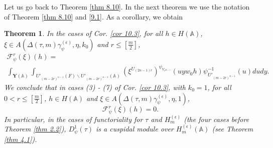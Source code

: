 \documentclass[12pts]{amsart}
\newcommand{\BA}{{\mathbb {A}}}
\newtheorem{thm}{Theorem}[section]
\begin{document}
Let us go back to Theorem \ref{thm 8.10}. In the next theorem we use the notation of Theorem \ref{thm 8.10} and \eqref{9.1}. As a corollary, we obtain

\begin{thm}\label{thm 11.2}
In the cases of Cor. \ref{cor 10.3}, for all $h\in H(\BA)$, $\xi\in A(\Delta(\tau,m)\gamma_\psi^{(\epsilon)},\eta,k_0)$ and 
$r\leq [\frac{m}{2}]$,
\begin{multline}\label{11.50}
\mathcal{F}^r_\psi(\xi)(h)=\\
\int_{\mathbf{Y}(\BA)} \int_{U'_{{(m-2r)}^{n-1}}(F)\backslash
	U'_{{(m-2r)}^{n-1}}(\BA)}(\xi^{U_{(2n-1)r}})^{\psi_{V_{r^{2n-1}}}}(uyw_0h)\psi^{-1}_{U'_{{(m-2r)}^{n-1}}}(u)dudy.
\end{multline}
We conclude that in cases (3) - (7) of Cor. \ref{cor 10.3}, with $k_0=1$, for all $0<r\leq [\frac{m}{2}]$, $h\in H(\BA)$ and $\xi\in A(\Delta(\tau,m)\gamma_\psi^{(\epsilon)},\eta,1)$,
\begin{equation}\label{11.51}
\mathcal{F}^r_\psi(\xi)(h)=0.
\end{equation}
In particular, in the cases of functoriality for $\tau$ and $H_m^{(\epsilon)}$ (the four cases before Theorem \ref{thm 2.2}), $D^1_\psi(\tau)$ is a cuspidal module over $H^{(\epsilon)}_m(\BA)$ (see Theorem \ref{thm 4.1}).
\end{thm}
\end{document}
